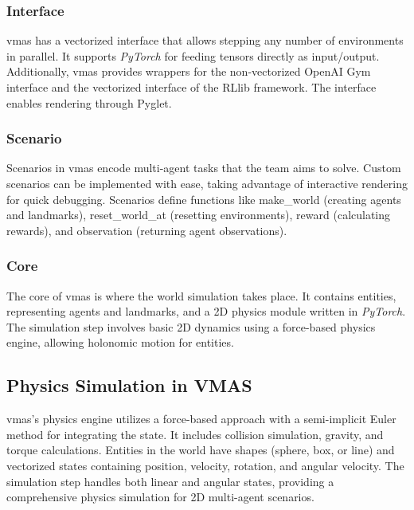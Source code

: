 \documentclass[12pt,a4paper,openright,twoside]{book}
\begin{document}
\subsubsection{Interface}
\ac{vmas} has a vectorized interface that allows stepping any number of environments in parallel. It supports \emph{PyTorch} for feeding tensors directly as input/output. Additionally, \ac{vmas} provides wrappers for the non-vectorized OpenAI Gym interface and the vectorized interface of the RLlib framework. The interface enables rendering through Pyglet.

\subsubsection{Scenario}
Scenarios in \ac{vmas} encode multi-agent tasks that the team aims to solve. Custom scenarios can be implemented with ease, taking advantage of interactive rendering for quick debugging. Scenarios define functions like make\_world (creating agents and landmarks), reset\_world\_at (resetting environments), reward (calculating rewards), and observation (returning agent observations).

\subsubsection{Core}
The core of \ac{vmas} is where the world simulation takes place. It contains entities, representing agents and landmarks, and a 2D physics module written in \emph{PyTorch}. The simulation step involves basic 2D dynamics using a force-based physics engine, allowing holonomic motion for entities.

\subsection{Physics Simulation in VMAS}

\ac{vmas}'s physics engine utilizes a force-based approach with a semi-implicit Euler method for integrating the state. It includes collision simulation, gravity, and torque calculations. Entities in the world have shapes (sphere, box, or line) and vectorized states containing position, velocity, rotation, and angular velocity. The simulation step handles both linear and angular states, providing a comprehensive physics simulation for 2D multi-agent scenarios.
\end{document}
